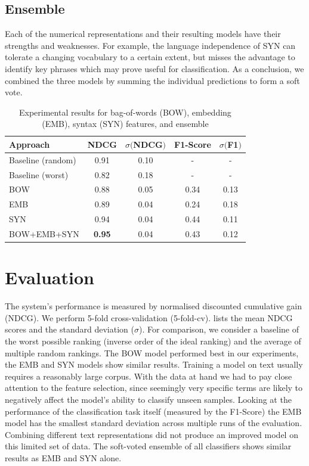 \subsection{Ensemble}
Each of the numerical representations and their resulting models have their strengths and weaknesses.
For example, the language independence of SYN can tolerate a changing vocabulary to a certain extent, but misses the advantage to identify key phrases which may prove useful for classification.
As a conclusion, we combined the three models by summing the individual predictions to form a soft vote.
\begin{table}[tb]
	\caption{Experimental results for bag-of-words (BOW), embedding (EMB), syntax (SYN) features, and ensemble}
	\label{tab:results}
	\begin{tabular}{lcccc}
		\toprule
		Approach & NDCG & $\sigma ($NDCG$)$ & F1-Score &  $\sigma ($F1$)$\\
		\midrule
		Baseline (random) & 0.91 & 0.10 & - & - \\
		Baseline (worst)  & 0.82 & 0.18 & - & - \\
		\midrule
		BOW & 0.88 & 0.05 & 0.34 & 0.13\\
		EMB & 0.89 & 0.04 & 0.24 & 0.18\\
		SYN & 0.94 & 0.04 & 0.44 & 0.11 \\
		BOW+EMB+SYN& \textbf{0.95} & 0.04 & 0.43 & 0.12\\
		\bottomrule
	\end{tabular}
\end{table}
\vfill\null
\section{Evaluation}



The system's performance is measured by normalised discounted cumulative gain (NDCG)\cite{ir}.
We perform 5-fold cross-validation (5-fold-cv).
 lists the mean NDCG scores and the standard deviation ($\sigma$).
For comparison, we consider a baseline of the worst possible ranking (inverse order of the ideal ranking) and the average of multiple random rankings.
The BOW model performed best in our experiments, the EMB and SYN models show similar results. 
Training a model on text usually requires a reasonably large corpus.
With the data at hand we had to pay close attention to the feature selection, since seemingly very specific terms are likely to negatively affect the model's ability to classify unseen samples.
Looking at the performance of the classification task itself (measured by the F1-Score) the EMB model has the smallest standard deviation across multiple runs of the evaluation.
Combining different text representations did not produce an improved model on this limited set of data.
The soft-voted ensemble of all classifiers shows similar results as EMB and SYN alone.

